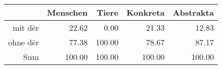 \begin{tabular}{rrrrr}
  \hline
 & Menschen & Tiere & Konkreta & Abstrakta \\ 
  \hline
mit dër & 22.62 & 0.00 & 21.33 & 12.83 \\ 
  ohne dër & 77.38 & 100.00 & 78.67 & 87.17 \\ 
  Sum & 100.00 & 100.00 & 100.00 & 100.00 \\ 
   \hline
\end{tabular}
